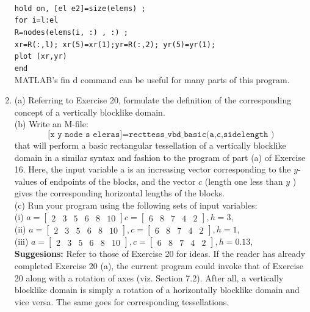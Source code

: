\documentclass[../main.tex]{subfiles}
\begin{document}
\begin{enumerate}
\\
\texttt{hold on, [el e2]=size(elems) ;
\\ 
for i=l:el
\\ 
R=nodes(elems(i, :) , :) ;
\\
xr=R(:,l); xr(5)=xr(1);yr=R(:,2); yr(5)=yr(1);
\\ 
plot (xr,yr)
\\
end }
\\
MATLAB's fin d command can be useful for many parts of this program.
	\item (a) Referring to Exercise 20, formulate the definition of the corresponding concept of a vertically blocklike domain.
	\\
(b) Write an M-file:
\\
$$\texttt{[x y node s eleras]=recttess\_vbd\_basic(a,c,sidelength )}$$ that will perform a basic rectangular tessellation of a vertically blocklike domain in a similar syntax and fashion to the program of part (a) of Exercise 16. Here, the input variable a is an increasing vector corresponding to the $y$-values of endpoints of the blocks, and the vector $c$ (length one less than $y$ ) gives the corresponding horizontal lengths of the blocks.
\\
(c) Run your program using the following sets of input variables:
\\
(i) $a=\left[\begin{array}{llllll}2 & 3 & 5 & 6 & 8&10\end{array}\right] c=\left[\begin{array}{lllll}6&8&7&4&2
\end{array}\right], h = 3,$
\\
(ii) $a=\left[\begin{array}{llllll}2 & 3 & 5 & 6 & 8&10\end{array}\right], c=\left[\begin{array}{lllll}6&8&7&4&2\end{array}\right], h=1$,
\\
(iii) $a=\left[\begin{array}{llllll}2 & 3 & 5 & 6 & 8&10\end{array}\right], c=\left[\begin{array}{lllll}6&8&7&4&2\end{array}\right], h=0.13$,
\\
\textbf{Suggesions:} Refer to those of Exercise 20 for ideas. If the reader has already completed Exercise 20 (a), the current program could invoke that of Exercise 20 along with a rotation of axes (viz. Section 7.2). After all, a vertically blocklike domain is simply a rotation of a horizontally blocklike domain and vice versa. The same goes for corresponding tessellations.

\end{enumerate}
\end{document}
